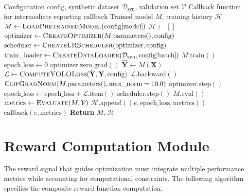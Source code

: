 \begin{algorithm}[H]
\caption{YOLO Training Execution Loop}
\label{alg:yolo_training}
\begin{algorithmic}[1]
\Require Configuration config, synthetic dataset $\mathcal{D}_{\text{syn}}$, validation set $\mathcal{V}$
\Require Callback function for intermediate reporting $\text{callback}$
\Ensure Trained model $M$, training history $\mathcal{H}$
\State $M \gets \Call{LoadPretrainedModel}{\text{config}[\text{model}]}$
\State $\mathcal{H} \gets []$ 
\State $\text{optimizer} \gets \Call{CreateOptimizer}{M.\text{parameters}(), \text{config}}$
\State $\text{scheduler} \gets \Call{CreateLRScheduler}{\text{optimizer}, \text{config}}$
\State $\text{train\_loader} \gets \Call{CreateDataLoader}{\mathcal{D}_{\text{syn}}, \text{config}[\text{batch}]}$
    \State $M.\text{train}()$
    \State $\text{epoch\_loss} \gets 0$
        \State $\text{optimizer}.\text{zero\_grad}()$
        \State $\hat{\mathbf{Y}} \gets M(\mathbf{X})$
        \State $\mathcal{L} \gets \Call{ComputeYOLOLoss}{\hat{\mathbf{Y}}, \mathbf{Y}, \text{config}}$
        \State $\mathcal{L}.\text{backward}()$
        \State $\Call{ClipGradNorm}{M.\text{parameters}(), \text{max\_norm}=10.0}$
        \State $\text{optimizer}.\text{step}()$
        \State $\text{epoch\_loss} \gets \text{epoch\_loss} + \mathcal{L}.\text{item}()$
    \EndFor
    \State $\text{scheduler}.\text{step}()$
    \State {}
        \State $M.\text{eval}()$
        \State $\text{metrics} \gets \Call{Evaluate}{M, \mathcal{V}}$
        \State $\mathcal{H}.\text{append}((e, \text{epoch\_loss}, \text{metrics}))$
        \State $\text{callback}(e, \text{metrics})$
    \EndIf
\EndFor
\State \textbf{Return} $M$, $\mathcal{H}$
\end{algorithmic}
\end{algorithm}

\section{Reward Computation Module}
\label{sec:reward_computation}

The reward signal that guides optimization must integrate multiple performance metrics while accounting for computational constraints. The following algorithm specifies the composite reward function computation.

